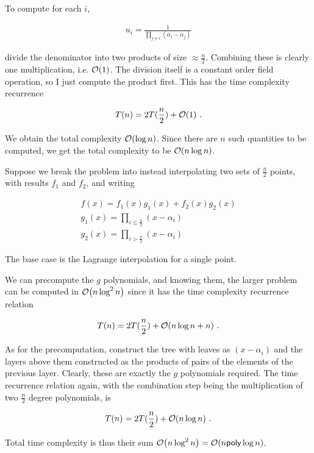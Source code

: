 \question

\newcommand{\poly}{\textsf{poly}}

\begin{alphaparts}
    \questionpart
    
    To compute for each \(i\),

    \begin{gather*}
        u_i = \frac{1}{\prod_{j\not = i}(\alpha_i - \alpha_j)}
    \end{gather*}

    divide the denominator into two products of size \(\approx \frac{n}{2}\).
    Combining these is clearly one multiplication, i.e. \(\order{1}\). The
    division itself is a constant order field operation, so I just compute the
    product first. This has the time complexity recurrence

    \begin{gather*}
        T(n) = 2T(\frac{n}{2}) + \order{1}~.
    \end{gather*}

    We obtain the total complexity \(\order{\log n}\). Since there are \(n\)
    such quantities to be computed, we get the total complexity to be
    \(\order{n\log n}\).

    \questionpart
    Suppose we break the problem into instead interpolating two sets of
    \(\frac{n}{2}\) points, with results \(f_1\) and \(f_2\), and writing

    \begin{gather*}
        f(x) = f_1(x) g_1(x) + f_2(x)g_2(x)\\
        g_1(x) = \prod_{i \leq \frac{n}{2}} (x-\alpha_i)\\
        g_2(x) = \prod_{i > \frac{n}{2}} (x-\alpha_i)
    \end{gather*}

    The base case is the Lagrange interpolation for a single point.

    We can precompute the \(g\) polynomials, and knowing them, the larger
    problem can be computed in \(\order{n\log^2 n}\) since it has the time
    complexity recurrence relation

    \begin{gather*}
        T(n) = 2T(\frac{n}{2}) + \order{n\log n + n}~.
    \end{gather*}

    As for the precomputation, construct the tree with leaves as
    \((x-\alpha_i)\) and the layers above them constructed as the products of
    pairs of the elements of the previous layer. Clearly, these are exactly the
    \(g\) polynomials required. The time recurrence relation again, with the
    combination step being the multiplication of two \(\frac{n}{2}\) degree
    polynomials, is

    \begin{gather*}
        T(n) = 2T(\frac{n}{2}) + \order{n\log n}~.
    \end{gather*}

    Total time complexity is thus their sum \(\order{n\log^2 n} = \order{n\poly \log n}\).

\end{alphaparts}